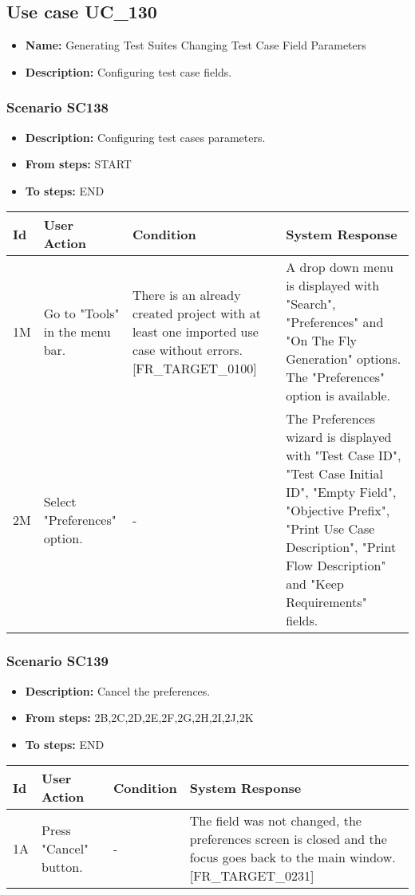 \documentclass[a4paper,11pt]{article}
\newcommand{\bl}{\\ \hline}
\begin{document}
\subsection*{Use case UC_130}
\begin{itemize}
\item {\bf Name: }Generating Test Suites Changing Test Case Field Parameters
			
\item {\bf Description: }Configuring test case fields.
\end{itemize}
\subsubsection*{Scenario SC138}
\begin{itemize}
\item {\bf Description:} Configuring test cases parameters.
\item {\bf From steps:} START
\item {\bf To steps:} END
\end{itemize}
\begin{tabular}{|p{0.4in}|p{1.5in}|p{1.5in}|p{1.5in}|}
\hline
Id & User Action & Condition & System Response \bl 
1M & Go to "Tools" in the menu bar.  & There is an already created project with at least one
						imported use case without errors. [FR_TARGET_0100] & A drop down menu is displayed with "Search",
						"Preferences" and "On The Fly Generation" options. The
						"Preferences" option is available.\bl
2M & Select "Preferences" option. & - & The Preferences wizard is displayed with "Test Case ID",
						"Test Case Initial ID", "Empty Field", "Objective Prefix", "Print
						Use Case Description", "Print Flow Description" and "Keep
						Requirements" fields.\bl
\end{tabular}
\subsubsection*{Scenario SC139}
\begin{itemize}
\item {\bf Description:} Cancel the preferences.
\item {\bf From steps:} 2B,2C,2D,2E,2F,2G,2H,2I,2J,2K
\item {\bf To steps:} END
\end{itemize}
\begin{tabular}{|p{0.4in}|p{1.5in}|p{1.5in}|p{1.5in}|}
\hline
Id & User Action & Condition & System Response \bl 
1A & Press "Cancel" button. & - & The field was not changed, the preferences screen is
						closed and the focus goes back to the main window.
						[FR_TARGET_0231]\bl
\end{tabular}
\end{document}
